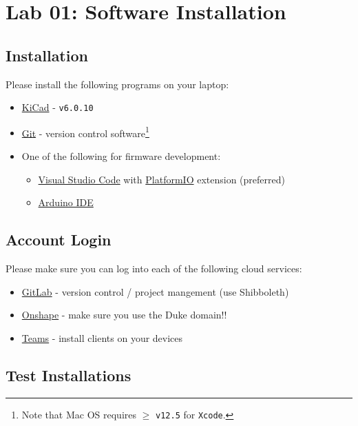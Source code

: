 \documentclass[10pt]{report}
\begin{document}
\section*{Lab 01: Software Installation}

\subsection*{Installation}
Please install the following programs on your laptop:
\begin{itemize}
    \item \href{https://kicad.org/}{KiCad} - \texttt{v6.0.10}
    \item \href{https://git-scm.com/}{Git} - version control software\footnote{Note that Mac OS requires $\geq$ \texttt{v12.5} for \texttt{Xcode}.}
    \item One of the following for firmware development:
    \begin{itemize}
        \item \href{https://code.visualstudio.com/}{Visual Studio Code} with \href{https://platformio.org/}{PlatformIO} extension (preferred)
        \item \href{https://www.arduino.cc/en/software}{Arduino IDE}
    \end{itemize}
\end{itemize}

\subsection*{Account Login}
Please make sure you can log into each of the following cloud services:
\begin{itemize}
    \item \href{https://gitlab.oit.duke.edu}{GitLab} - version control / project mangement (use Shibboleth)
    \item \href{https://duke.onshape.com}{Onshape} - make sure you use the Duke domain!!
    \item \href{https://teams.microsoft.com}{Teams} - install clients on your devices
\end{itemize}

\subsection*{Test Installations}
\end{document}
